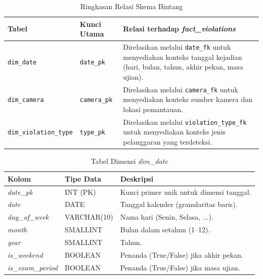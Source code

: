 \begin{table}[H]
\centering
\caption{Ringkasan Relasi Skema Bintang}
\label{tab:ringkasan-relasi-star-schema}
\small\setlength{\tabcolsep}{4pt}\begin{tabularx}{\textwidth}{>{\raggedright\arraybackslash}p{}>{\raggedright\arraybackslash}p{}>{\raggedright\arraybackslash}X}
\toprule
\textbf{Tabel} & \textbf{Kunci Utama} & \textbf{Relasi terhadap \textit{fact\_violations}} \\
\midrule
\texttt{dim\_date} & \texttt{date\_pk} & Direlasikan melalui \texttt{date\_fk} untuk menyediakan konteks tanggal kejadian (hari, bulan, tahun, akhir pekan, masa ujian). \\
\texttt{dim\_camera} & \texttt{camera\_pk} & Direlasikan melalui \texttt{camera\_fk} untuk menyediakan konteks sumber kamera dan lokasi pemantauan. \\
\texttt{dim\_violation\_type} & \texttt{type\_pk} & Direlasikan melalui \texttt{violation\_type\_fk} untuk menyediakan konteks jenis pelanggaran yang terdeteksi. \\
\bottomrule
\end{tabularx}
\end{table}

\begin{table}[H]
\centering
\caption{Tabel Dimensi \textit{dim\_date}}
\label{tab:dim_date}
\small\setlength{\tabcolsep}{4pt}\begin{tabularx}{\textwidth}{>{\raggedright\arraybackslash}p{}>{\raggedright\arraybackslash}p{}>{\raggedright\arraybackslash}X}
\toprule
\textbf{Kolom} & \textbf{Tipe Data} & \textbf{Deskripsi} \\
\midrule
\textit{date\_pk} & INT (PK) & Kunci primer unik untuk dimensi tanggal. \\
\textit{date} & DATE & Tanggal kalender (granularitas baris). \\
\textit{day\_of\_week} & VARCHAR(10) & Nama hari (Senin, Selasa, ...). \\
\textit{month} & SMALLINT & Bulan dalam setahun (1--12). \\
\textit{year} & SMALLINT & Tahun. \\
\textit{is\_weekend} & BOOLEAN & Penanda (True/False) jika akhir pekan. \\
\textit{is\_exam\_period} & BOOLEAN & Penanda (True/False) jika masa ujian. \\
\bottomrule
\end{tabularx}
\end{table}

